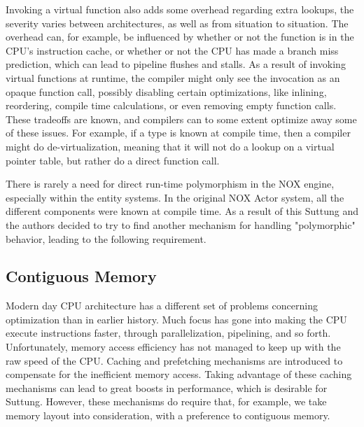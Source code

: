 Invoking a virtual function also adds some overhead regarding extra lookups, the severity varies between architectures,
as well as from situation to situation.
The overhead can, for example, be influenced by whether or not the function is in the CPU's instruction cache, or whether or not the CPU has made a branch miss prediction, which can lead to pipeline flushes and stalls\cite{scott_meyers_cpu_caches_and_why_you_care}\cite[Data Locality]{game_programming_patterns}.
As a result of invoking virtual functions at runtime, the compiler might only see the invocation as an opaque function call,
possibly disabling certain optimizations, like inlining, reordering, compile time calculations, or even removing empty function calls.
These tradeoffs are known, and compilers can to some extent optimize away some of these issues.
For example, if a type is known at compile time, then a compiler might do de-virtualization,
meaning that it will not do a lookup on a virtual pointer table, but rather do a direct function call\cite{lazarenko_devirtualization}.

There is rarely a need for direct run-time polymorphism in the NOX engine, especially within the entity systems.
In the original NOX Actor system, all the different components were known at compile time.
As a result of this Suttung and the authors decided to try to find another mechanism for handling "polymorphic" behavior, leading to the following requirement.


\subsection{Contiguous Memory}
\label{subsec:requirements_performance_contiguous_memory}
Modern day CPU architecture has a different set of problems concerning optimization than in earlier history.
Much focus has gone into making the CPU execute instructions faster, through parallelization, pipelining, and so forth.
Unfortunately, memory access efficiency has not managed to keep up with the raw speed of the CPU.
Caching and prefetching mechanisms are introduced to compensate for the inefficient memory access\cite[p. 153]{game_engine_architecture}.
Taking advantage of these caching mechanisms can lead to great boosts in performance, which is desirable for Suttung.
However, these mechanisms do require that, for example, we take memory layout into consideration, with a preference
to contiguous memory.

